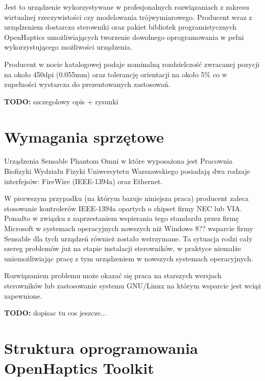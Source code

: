 \documentclass[licencjacka]{pracamgr}
\begin{document}
Jest to urządzenie wykorzystywane w profesjonalnych rozwiązaniach z zakresu wirtualnej rzeczywistości czy modelowania trójwymiarowego. Producent wraz z urządzeniem dostarcza  sterowniki oraz pakiet bibliotek programistycznych OpenHaptics umożliwiających tworzenie dowolnego oprogramowania w pełni wykorzystującego możliwości urządzenia. 

Producent w nocie katalogowej podaje nominalną rozdzielczość zwracanej pozycji na około 450dpi (0.055mm) oraz tolerancję orientacji na około 5\% co w zupełności wystarcza do prezentowanych zastosowań.

\textbf{TODO:} szczegolowy opis + rysunki
	
\section{Wymagania sprzętowe}

	Urządzenia Sensable Phantom Omni w które wyposażona jest Pracownia Biofizyki Wydziału Fizyki Uniwersytetu Warszawskiego posiadają dwa rodzaje interfejsów: FireWire (IEEE-1394a) oraz Ethernet.
	
W pierwszym przypadku (na którym bazuje niniejsza praca) producent zaleca stosowanie kontrolerów IEEE-1394a opartych o chipset firmy NEC lub VIA. Ponadto w związku z zaprzestaniem wspierania tego standardu przez firmę Microsoft w systemach operacyjnych nowszych niż Windows 8?? wsparcie firmy Sensable dla tych urządzeń również zostało wstrzymane. Ta sytuacja rodzi cały szereg problemów już na etapie instalacji sterowników, w praktyce niemalże uniemożliwiając pracę z tym urządzeniem w nowszych systemach operacyjnych. 

Rozwiązaniem problemu może okazać się praca na starszych wersjach sterowników lub zastosowanie systemu GNU/Linux na którym wsparcie jest wciąż zapewnione.
	
\textbf{TODO:} dopisac tu cos jeszcze...

\section{Struktura oprogramowania OpenHaptics Toolkit}
\end{document}
